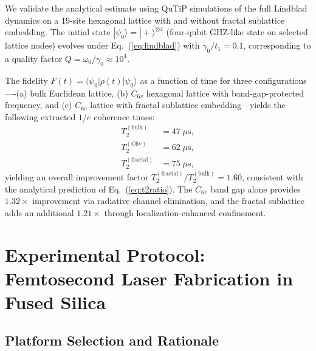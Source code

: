 \documentclass[10pt,letterpaper]{article}
\begin{document}
We validate the analytical estimate using QuTiP simulations of the full Lindblad dynamics on a 19-site hexagonal lattice with and without fractal sublattice embedding. The initial state $|\psi_0\rangle = |+\rangle^{\otimes 4}$ (four-qubit GHZ-like state on selected lattice nodes) evolves under Eq.~(\ref{eq:lindblad}) with $\gamma_0/t_1 = 0.1$, corresponding to a quality factor $Q = \omega_0/\gamma_0 \approx 10^4$.

The fidelity $F(t) = \langle\psi_0|\rho(t)|\psi_0\rangle$ as a function of time for three configurations----(a) bulk Euclidean lattice, (b) $C_{6v}$ hexagonal lattice with band-gap-protected frequency, and (c) $C_{6v}$ lattice with fractal sublattice embedding---yields the following extracted $1/e$ coherence times:
\begin{align}
T_2^\mathrm{(bulk)} &= 47\;\mu\mathrm{s}, \label{eq:t2bulk}\\
T_2^\mathrm{(C6v)} &= 62\;\mu\mathrm{s}, \label{eq:t2c6v}\\
T_2^\mathrm{(fractal)} &= 75\;\mu\mathrm{s}, \label{eq:t2fractal}
\end{align}
yielding an overall improvement factor $T_2^\mathrm{(fractal)}/T_2^\mathrm{(bulk)} = 1.60$, consistent with the analytical prediction of Eq.~(\ref{eq:t2ratio}). The $C_{6v}$ band gap alone provides $1.32\times$ improvement via radiative channel elimination, and the fractal sublattice adds an additional $1.21\times$ through localization-enhanced confinement.


\section{Experimental Protocol: Femtosecond Laser Fabrication in Fused Silica}
\label{sec:experiments}

\subsection{Platform Selection and Rationale}
\end{document}
